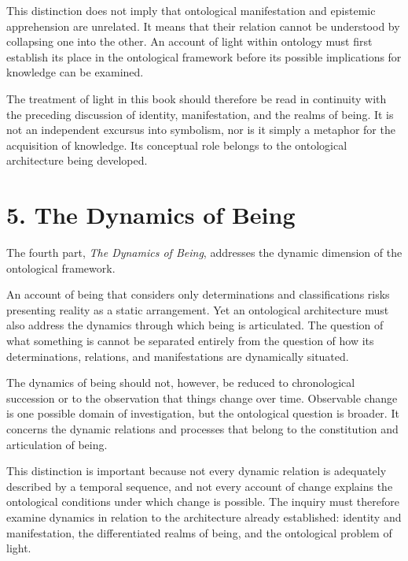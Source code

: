 This distinction does not imply that ontological
manifestation and epistemic apprehension are unrelated.
It means that their relation cannot be understood by
collapsing one into the other. An account of light within
ontology must first establish its place in the ontological
framework before its possible implications for knowledge
can be examined.

The treatment of light in this book should therefore
be read in continuity with the preceding discussion of
identity, manifestation, and the realms of being. It is
not an independent excursus into symbolism, nor is it
simply a metaphor for the acquisition of knowledge.
Its conceptual role belongs to the ontological architecture
being developed.


\section*{5. The Dynamics of Being}

The fourth part, \textit{The Dynamics of Being}, addresses
the dynamic dimension of the ontological framework.

An account of being that considers only determinations
and classifications risks presenting reality as a static
arrangement. Yet an ontological architecture must also
address the dynamics through which being is articulated.
The question of what something is cannot be separated
entirely from the question of how its determinations,
relations, and manifestations are dynamically situated.

The dynamics of being should not, however, be reduced
to chronological succession or to the observation that
things change over time. Observable change is one
possible domain of investigation, but the ontological
question is broader. It concerns the dynamic relations
and processes that belong to the constitution and
articulation of being.

This distinction is important because not every dynamic
relation is adequately described by a temporal sequence,
and not every account of change explains the ontological
conditions under which change is possible. The inquiry
must therefore examine dynamics in relation to the
architecture already established: identity and
manifestation, the differentiated realms of being,
and the ontological problem of light.

